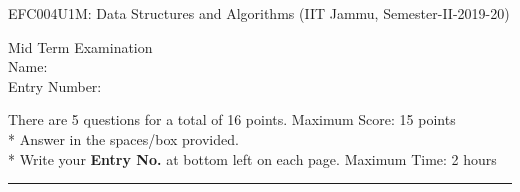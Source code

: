 \documentclass[14pt]{article}
\begin{document}
\large
EFC004U1M: Data Structures and Algorithms (IIT Jammu, Semester-II-2019-20)

\begin{flushright}
Mid Term Examination\\
\vspace{1em}
Name: \underline{\hspace{6cm}} \\
\vspace{1em}
Entry Number: \underline{\hspace{6cm}} \\
\end{flushright}

\RaggedRight

There are 5 questions for a total of 16 points. 
\hfill Maximum Score: 15 points \\*
Answer in the spaces/box provided. \\* Write your \textbf{Entry No.} at bottom left on each page.
\hfill Maximum Time: 2 hours
\noindent\rule{\textwidth}{1pt}
\end{document}
